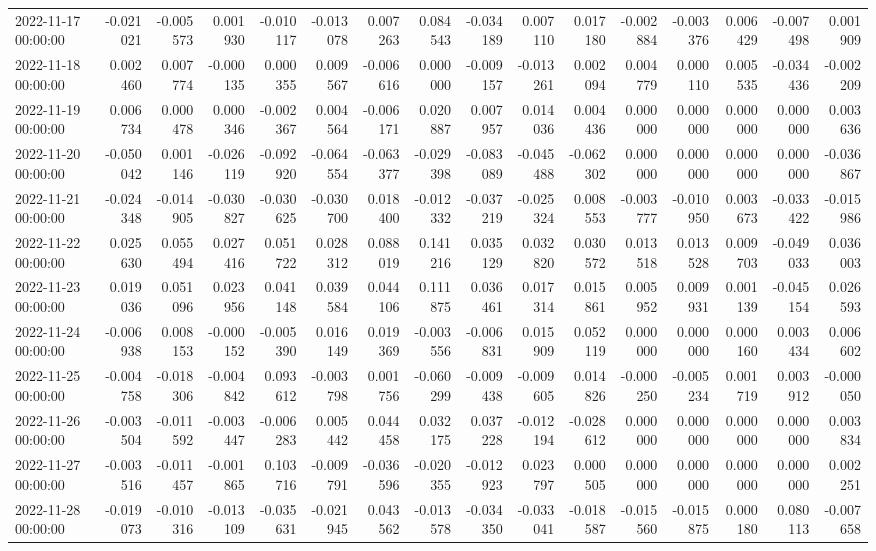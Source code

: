 \begin{tabular}{lrrrrrrrrrrrrrrr}
2022-11-17 00:00:00 & -0.021021 & -0.005573 & 0.001930 & -0.010117 & -0.013078 & 0.007263 & 0.084543 & -0.034189 & 0.007110 & 0.017180 & -0.002884 & -0.003376 & 0.006429 & -0.007498 & 0.001909 \\
2022-11-18 00:00:00 & 0.002460 & 0.007774 & -0.000135 & 0.000355 & 0.009567 & -0.006616 & 0.000000 & -0.009157 & -0.013261 & 0.002094 & 0.004779 & 0.000110 & 0.005535 & -0.034436 & -0.002209 \\
2022-11-19 00:00:00 & 0.006734 & 0.000478 & 0.000346 & -0.002367 & 0.004564 & -0.006171 & 0.020887 & 0.007957 & 0.014036 & 0.004436 & 0.000000 & 0.000000 & 0.000000 & 0.000000 & 0.003636 \\
2022-11-20 00:00:00 & -0.050042 & 0.001146 & -0.026119 & -0.092920 & -0.064554 & -0.063377 & -0.029398 & -0.083089 & -0.045488 & -0.062302 & 0.000000 & 0.000000 & 0.000000 & 0.000000 & -0.036867 \\
2022-11-21 00:00:00 & -0.024348 & -0.014905 & -0.030827 & -0.030625 & -0.030700 & 0.018400 & -0.012332 & -0.037219 & -0.025324 & 0.008553 & -0.003777 & -0.010950 & 0.003673 & -0.033422 & -0.015986 \\
2022-11-22 00:00:00 & 0.025630 & 0.055494 & 0.027416 & 0.051722 & 0.028312 & 0.088019 & 0.141216 & 0.035129 & 0.032820 & 0.030572 & 0.013518 & 0.013528 & 0.009703 & -0.049033 & 0.036003 \\
2022-11-23 00:00:00 & 0.019036 & 0.051096 & 0.023956 & 0.041148 & 0.039584 & 0.044106 & 0.111875 & 0.036461 & 0.017314 & 0.015861 & 0.005952 & 0.009931 & 0.001139 & -0.045154 & 0.026593 \\
2022-11-24 00:00:00 & -0.006938 & 0.008153 & -0.000152 & -0.005390 & 0.016149 & 0.019369 & -0.003556 & -0.006831 & 0.015909 & 0.052119 & 0.000000 & 0.000000 & 0.000160 & 0.003434 & 0.006602 \\
2022-11-25 00:00:00 & -0.004758 & -0.018306 & -0.004842 & 0.093612 & -0.003798 & 0.001756 & -0.060299 & -0.009438 & -0.009605 & 0.014826 & -0.000250 & -0.005234 & 0.001719 & 0.003912 & -0.000050 \\
2022-11-26 00:00:00 & -0.003504 & -0.011592 & -0.003447 & -0.006283 & 0.005442 & 0.044458 & 0.032175 & 0.037228 & -0.012194 & -0.028612 & 0.000000 & 0.000000 & 0.000000 & 0.000000 & 0.003834 \\
2022-11-27 00:00:00 & -0.003516 & -0.011457 & -0.001865 & 0.103716 & -0.009791 & -0.036596 & -0.020355 & -0.012923 & 0.023797 & 0.000505 & 0.000000 & 0.000000 & 0.000000 & 0.000000 & 0.002251 \\
2022-11-28 00:00:00 & -0.019073 & -0.010316 & -0.013109 & -0.035631 & -0.021945 & 0.043562 & -0.013578 & -0.034350 & -0.033041 & -0.018587 & -0.015560 & -0.015875 & 0.000180 & 0.080113 & -0.007658 \\

\end{tabular}
